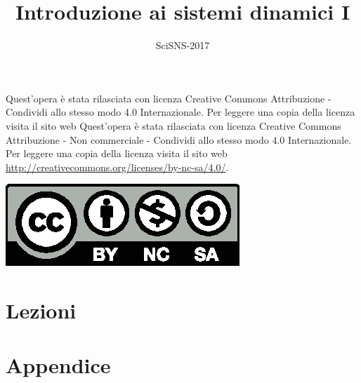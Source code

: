 \documentclass[a4paper]{scrbook}
\title{Introduzione ai sistemi dinamici I}
\author{SciSNS-2017}
\theoremstyle{definition}
\numberwithin{equation}{chapter}
\begin{document}
	
\frontmatter

\maketitle

Quest'opera è stata rilasciata con licenza Creative Commons Attribuzione - Condividi allo stesso modo 4.0 Internazionale. Per leggere una copia della licenza visita il sito web Quest'opera è stata rilasciata con licenza Creative Commons Attribuzione - Non commerciale - Condividi allo stesso modo 4.0 Internazionale. Per leggere una copia della licenza visita il sito web \url{http://creativecommons.org/licenses/by-nc-sa/4.0/}.
\begin{center}
	\href{http://creativecommons.org/licenses/by-nc-sa/4.0/}{\includegraphics[scale = 0.8]{by-nc-sa}}
\end{center}	


\tableofcontents


\mainmatter

\chapter{Lezioni}



\appendix

\chapter{Appendice}


\backmatter


\end{document}
